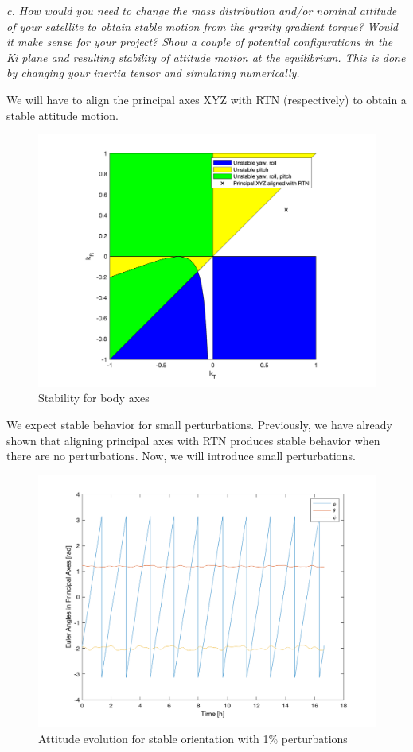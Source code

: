 \textit{c. How would you need to change the mass distribution and/or nominal attitude of your satellite to obtain stable motion from the gravity gradient torque? Would it make sense for your project? Show a couple of potential configurations in the Ki plane and resulting stability of attitude motion at the equilibrium. This is done by changing your inertia tensor and simulating numerically.}

We will have to align the principal axes XYZ with RTN (respectively) to obtain a stable attitude motion.

\begin{figure}[H]
\centering
\includegraphics[scale=0.6]{Images/ps5_problem1c.png}
\caption{Stability for body axes}
\label{fig:ps5_problem1c}
\end{figure}

We expect stable behavior for small perturbations. Previously, we have already shown that aligning principal axes with RTN produces stable behavior when there are no perturbations. Now, we will introduce small perturbations.

\begin{figure}[H]
\centering
\includegraphics[scale=0.6]{Images/ps5_problem1c_angle.png}
\caption{Attitude evolution for stable orientation with 1\% perturbations}
\label{fig:ps5_problem1c_angle}
\end{figure}

